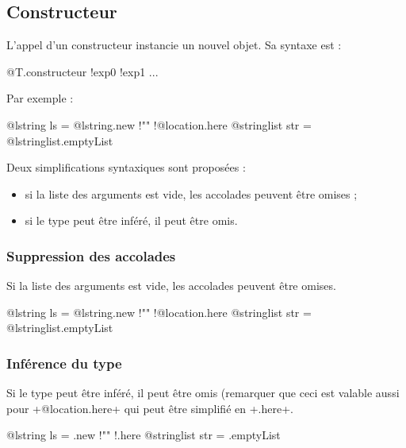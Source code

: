 








\subsection{Constructeur}

L'appel d'un constructeur instancie un nouvel objet. Sa syntaxe est :

\begin{galgas}
@T.constructeur {!exp0 !exp1 ...}
\end{galgas}

Par exemple :
\begin{galgas}
@lstring ls = @lstring.new {!"" !@location.here{}}
@stringlist str = @lstringlist.emptyList {}
\end{galgas}

Deux simplifications syntaxiques sont proposées :
\begin{itemize}
  \item si la liste des arguments est vide, les accolades peuvent être omises ;
  \item si le type peut être inféré, il peut être omis.
\end{itemize}


\subsubsection{Suppression des accolades}

Si la liste des arguments est vide, les accolades peuvent être omises.

\begin{galgas}
@lstring ls = @lstring.new {!"" !@location.here}
@stringlist str = @lstringlist.emptyList
\end{galgas}



\subsubsection{Inférence du type}

Si le type peut être inféré, il peut être omis (remarquer que ceci est valable aussi pour \ggs+@location.here+ qui peut être simplifié en \ggs+.here+.

\begin{galgas}
@lstring ls = .new {!"" !.here}
@stringlist str = .emptyList
\end{galgas}









